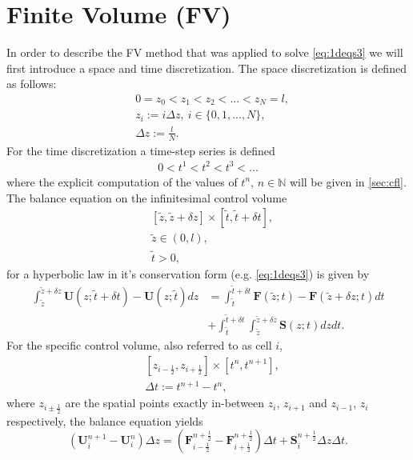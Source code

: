 \documentclass[a4paper, oneside]{discothesis}
\begin{document}
\section{Finite Volume (FV)} \label{sec:fv}
In order to describe the FV method that was applied to solve \autoref{eq:1deqs3} we will first introduce a space and time discretization.
The space discretization is defined as follows:
\begin{align}
	&0 = z_0 < z_1 < z_2 < ... < z_N = l, \\
	&z_i :=  i \Delta z,\ i \in \{0,1,...,N\} , \\
	&\Delta z := \frac{l}{N}.
\end{align}
For the time discretization a time-step series is defined
\begin{align}
	0 < t^1 < t^2 < t^3 < ...
\end{align}
where the explicit computation of the values of $t^n$, $n \in \mathbb{N}$  will be given in \autoref{sec:cfl}.
The balance equation on the infinitesimal control volume 
\begin{align}
	&[\tilde{z}, \tilde{z} + \delta z] \times [\tilde{t}, \tilde{t} + \delta t], \\
	&\tilde{z} \in (0,l), \\
	&\tilde{t} > 0,
\end{align}
for a hyperbolic law in it's conservation form \cite{guinot2012wave} (e.g. \autoref{eq:1deqs3}) is given by
\begin{align}
	\int_{\tilde{z}}^{\tilde{z} + \delta z} \mathbf{U} (z; \tilde{t} + \delta t) - \mathbf{U} (z;\tilde{t}) dz &= \int_{\tilde{t}}^{\tilde{t}+\delta t} \mathbf{F}(\tilde{z};t) - \mathbf{F}(\tilde{z} + \delta z; t) dt\\
																											   &+ \int_{\tilde{t}}^{\tilde{t} + \delta t} \int_{\tilde{z}}^{\tilde{z} + \delta z}  \mathbf{S}(z;t) dzdt.
\end{align}
For the specific control volume, also referred to as cell $i$,
\begin{align}
	&[z_{i-\frac{1}{2}},z_{i+\frac{1}{2}}] \times [t^n, t^{n+1}], \\
	&\Delta t := t^{n+1}-t^n,
\end{align}
where $z_{i \pm \frac{1}{2}}$ are the spatial points exactly in-between $z_{i}$, $z_{i+1}$ and $z_{i-1}$, $z_{i}$ respectively, the balance equation yields
\begin{equation}
	(\mathbf{U} _i^{n+1}-\mathbf{U} _i^n) \Delta z = (\mathbf{F}_{i-\frac{1}{2}}^{n+\frac{1}{2}} - \mathbf{F}_{i+\frac{1}{2}}^{n+\frac{1}{2}}) \Delta t + \mathbf{S}_i^{n+\frac{1}{2}} \Delta z \Delta t.
\end{equation}
\end{document}
